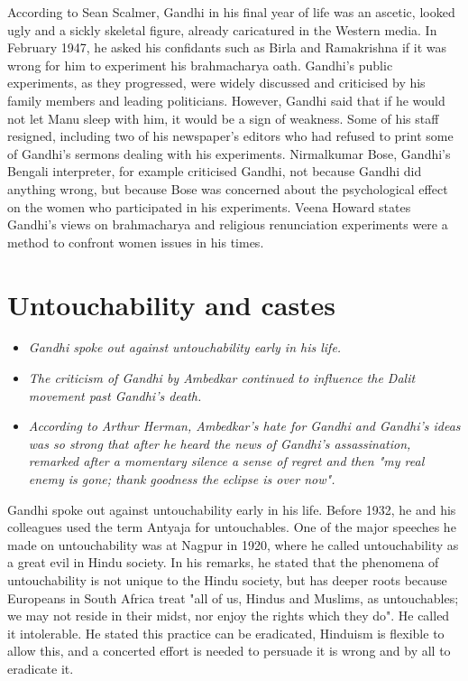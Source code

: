 According to Sean Scalmer, Gandhi in his final year of life was an
ascetic, looked ugly and a sickly skeletal figure, already caricatured
in the Western media. In February 1947, he asked his confidants such as
Birla and Ramakrishna if it was wrong for him to experiment his
brahmacharya oath. Gandhi's public experiments, as they progressed, were
widely discussed and criticised by his family members and leading
politicians. However, Gandhi said that if he would not let Manu sleep
with him, it would be a sign of weakness. Some of his staff resigned,
including two of his newspaper's editors who had refused to print some
of Gandhi's sermons dealing with his experiments. Nirmalkumar Bose,
Gandhi's Bengali interpreter, for example criticised Gandhi, not because
Gandhi did anything wrong, but because Bose was concerned about the
psychological effect on the women who participated in his experiments.
Veena Howard states Gandhi's views on brahmacharya and religious
renunciation experiments were a method to confront women issues in his
times.

\section{Untouchability and castes}\label{untouchability-and-castes}

\begin{itemize}
\item
  \emph{Gandhi spoke out against untouchability early in his life.}
\item
  \emph{The criticism of Gandhi by Ambedkar continued to influence the
  Dalit movement past Gandhi's death.}
\item
  \emph{According to Arthur Herman, Ambedkar's hate for Gandhi and
  Gandhi's ideas was so strong that after he heard the news of Gandhi's
  assassination, remarked after a momentary silence a sense of regret
  and then "my real enemy is gone; thank goodness the eclipse is over
  now".}
\end{itemize}

Gandhi spoke out against untouchability early in his life. Before 1932,
he and his colleagues used the term Antyaja for untouchables. One of the
major speeches he made on untouchability was at Nagpur in 1920, where he
called untouchability as a great evil in Hindu society. In his remarks,
he stated that the phenomena of untouchability is not unique to the
Hindu society, but has deeper roots because Europeans in South Africa
treat "all of us, Hindus and Muslims, as untouchables; we may not reside
in their midst, nor enjoy the rights which they do". He called it
intolerable. He stated this practice can be eradicated, Hinduism is
flexible to allow this, and a concerted effort is needed to persuade it
is wrong and by all to eradicate it.

